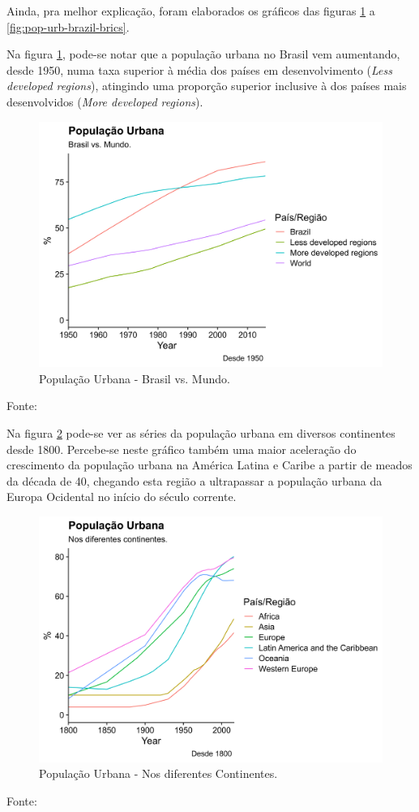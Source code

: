 \documentclass[
	12pt,				%
	oneside,			%
	a4paper,			%
	chapter=TITLE,		%
	section=TITLE,		%
	english,			%
	brazil				%
	]{abntex2}
\newcommand{\bcenter}{\begin{center}}
\newcommand{\ecenter}{\end{center}}
\begin{document}
Ainda, pra melhor explicação, foram elaborados os gráficos das figuras
\ref{fig:pop-urb-mundo} a \ref{fig:pop-urb-brazil-brics}.

Na figura \ref{fig:pop-urb-mundo}, pode-se notar que a população urbana
no Brasil vem aumentando, desde 1950, numa taxa superior à média dos
países em desenvolvimento (\emph{Less developed regions}), atingindo uma
proporção superior inclusive à dos países mais desenvolvidos (\emph{More
developed regions}).
\begin{figure}[H]

{\centering \includegraphics[width=0.8\linewidth]{images/pop-urb-mundo-1} 

}

\caption{População Urbana - Brasil vs. Mundo.}\label{fig:pop-urb-mundo}
\end{figure}
\bcenter
Fonte: \textcite{doi:10.1177/0959683609356587} \ecenter

Na figura \ref{fig:pop-urb-continents} pode-se ver as séries da
população urbana em diversos continentes desde 1800. Percebe-se neste
gráfico também uma maior aceleração do crescimento da população urbana
na América Latina e Caribe a partir de meados da década de 40, chegando
esta região a ultrapassar a população urbana da Europa Ocidental no
início do século corrente.
\begin{figure}[H]

{\centering \includegraphics[width=0.8\linewidth]{images/pop-urb-continents-1} 

}

\caption{População Urbana - Nos diferentes Continentes.}\label{fig:pop-urb-continents}
\end{figure}
\bcenter
Fonte: \textcite{doi:10.1177/0959683609356587} \ecenter
\end{document}
